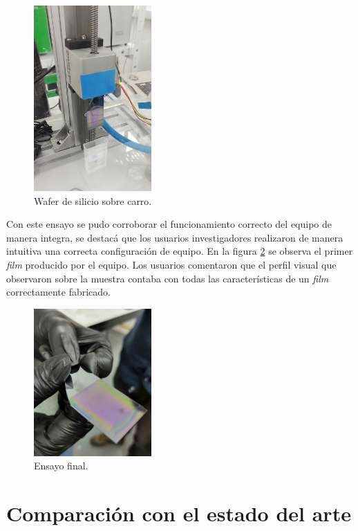 \begin{figure}[h!]
\centering 
\includegraphics[width=0.4\textwidth]{./Figures/prueba_a.jpg}
\caption{Wafer de silicio sobre carro.}
\label{fig:equipo_laboratorio_a}
\end{figure}

Con este ensayo se pudo corroborar el funcionamiento correcto del equipo de manera integra, se destacá que los usuarios investigadores realizaron de manera intuitiva una correcta configuración de equipo. En la figura \ref{fig:equipo_laboratorio_c} se observa el primer \textit{film} producido por el equipo. Los usuarios comentaron que el perfil visual que observaron sobre la muestra contaba con todas las características de un \textit{film} correctamente fabricado.  

\begin{figure}[h!]
\centering 
\includegraphics[width=0.4\textwidth]{./Figures/prueba_c.jpg}
\caption{Ensayo final.}
\label{fig:equipo_laboratorio_c}
\end{figure}

\section{Comparación con el estado del arte}

